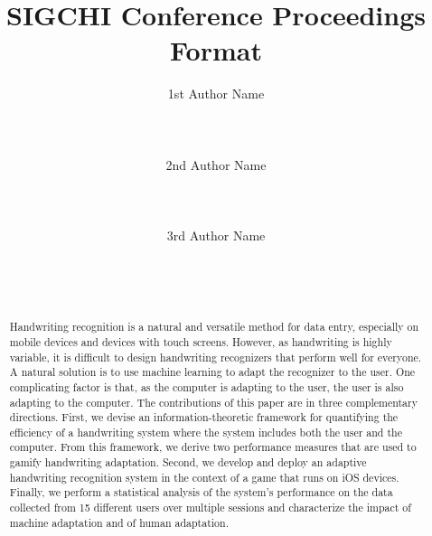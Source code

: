 \documentclass{sigchi}
\begin{document}
\title{SIGCHI Conference Proceedings Format}

\author{
  \alignauthor 1st Author Name\\
    \\
    \\
    \\
  \alignauthor 2nd Author Name\\
    \\
    \\
    \\
  \alignauthor 3rd Author Name\\
    \\
    \\
    \\
}


\maketitle

\begin{abstract}
Handwriting recognition is a natural and versatile method for data
entry, especially on mobile devices and devices with touch
screens. However, as handwriting is highly variable, it is difficult
to design handwriting recognizers that perform well for everyone. A
natural solution is to use machine learning to adapt the recognizer to
the user. One complicating factor is that, as the computer is adapting
to the user, the user is also adapting to the computer. The
contributions of this paper are in three complementary
directions. First, we devise an information-theoretic framework for
quantifying the efficiency of a handwriting system where the system
includes both the user and the computer. From this framework, we
derive two performance measures that are used to gamify handwriting
adaptation. Second, we develop and deploy an adaptive handwriting
recognition system in the context of a game that runs on iOS
devices. Finally, we perform a statistical analysis of the system’s
performance on the data collected from 15 different users over
multiple sessions and characterize the impact of machine adaptation
and of human adaptation.
\end{abstract}
\end{document}
